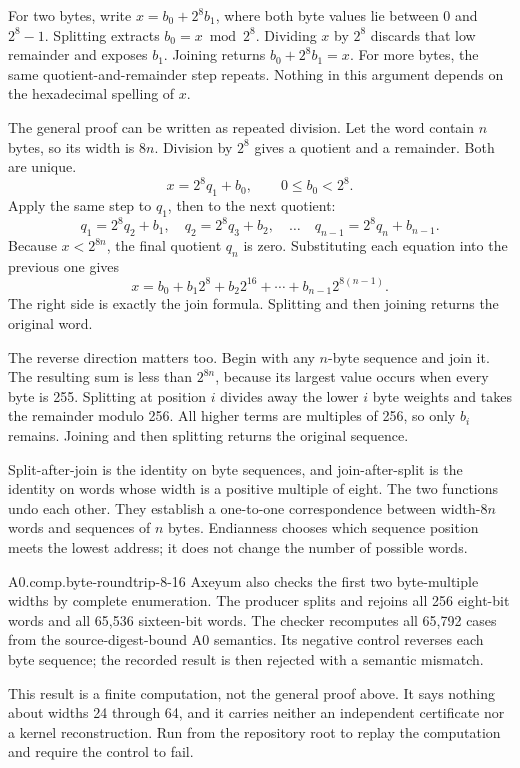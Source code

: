 For two bytes, write \(x=b_0+2^8b_1\), where both byte values lie between 0
and \(2^8-1\). Splitting extracts \(b_0=x\bmod 2^8\). Dividing \(x\) by
\(2^8\) discards that low remainder and exposes \(b_1\). Joining returns
\(b_0+2^8b_1=x\). For more bytes, the same quotient-and-remainder step repeats.
Nothing in this argument depends on the hexadecimal spelling of \(x\).

The general proof can be written as repeated division. Let the word contain
\(n\) bytes, so its width is \(8n\). Division by \(2^8\) gives a quotient and
a remainder. Both are unique.
\[
  x=2^8q_1+b_0,\qquad 0\leq b_0<2^8.
\]
Apply the same step to \(q_1\), then to the next quotient:
\[
  q_1=2^8q_2+b_1,\quad
  q_2=2^8q_3+b_2,\quad\ldots\quad
  q_{n-1}=2^8q_n+b_{n-1}.
\]
Because \(x<2^{8n}\), the final quotient \(q_n\) is zero. Substituting each
equation into the previous one gives
\[
  x=b_0+b_1 2^8+b_2 2^{16}+\cdots+b_{n-1}2^{8(n-1)}.
\]
The right side is exactly the join formula. Splitting and then joining returns
the original word.

The reverse direction matters too. Begin with any \(n\)-byte sequence and
join it. The resulting sum is less than \(2^{8n}\), because its largest value
occurs when every byte is 255. Splitting at position \(i\) divides away the
lower \(i\) byte weights and takes the remainder modulo 256. All higher terms
are multiples of 256, so only \(b_i\) remains. Joining and then splitting
returns the original sequence.

\begin{proofkit}[title={\iconProofKit\ Split and join form a bijection}]
Split-after-join is the identity on byte sequences, and join-after-split is the
identity on words whose width is a positive multiple of eight. The two
functions undo each other. They establish a one-to-one correspondence between
width-\(8n\) words and sequences of \(n\) bytes. Endianness chooses which
sequence position meets the lowest address; it does not change the number of
possible words.
\end{proofkit}

\begin{artifact}{A0.comp.byte-roundtrip-8-16}
Axeyum also checks the first two byte-multiple widths by complete enumeration.
The producer splits and rejoins all 256 eight-bit words and all 65,536
sixteen-bit words. The checker recomputes all 65,792 cases from the
source-digest-bound A0 semantics. Its negative control reverses each byte
sequence; the recorded result is then rejected with a semantic mismatch.

This result is a finite computation, not the general proof above. It says
nothing about widths 24 through 64, and it carries neither an independent
certificate nor a kernel reconstruction. Run  from the
repository root to replay the computation and require the control to fail.
\end{artifact}

